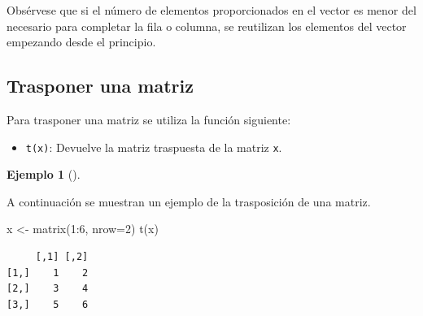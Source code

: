 \documentclass[
  a4paper,
]{scrreport}
\newenvironment{Shaded}{\begin{snugshade}}{\end{snugshade}}
\newcommand{\AttributeTok}[1]{\textcolor[rgb]{0.40,0.45,0.13}{#1}}
\newcommand{\DecValTok}[1]{\textcolor[rgb]{0.68,0.00,0.00}{#1}}
\newcommand{\FunctionTok}[1]{\textcolor[rgb]{0.28,0.35,0.67}{#1}}
\newcommand{\NormalTok}[1]{\textcolor[rgb]{0.00,0.23,0.31}{#1}}
\newcommand{\OtherTok}[1]{\textcolor[rgb]{0.00,0.23,0.31}{#1}}
\newcommand{\SpecialCharTok}[1]{\textcolor[rgb]{0.37,0.37,0.37}{#1}}
\providecommand{\tightlist}{%
  \setlength{\itemsep}{0pt}\setlength{\parskip}{0pt}}\usepackage{longtable,booktabs,array}
\theoremstyle{definition}
\theoremstyle{definition}
\newtheorem{example}{Ejemplo}[chapter]
\theoremstyle{remark}
\begin{document}
\begin{tcolorbox}[enhanced jigsaw, colbacktitle=quarto-callout-warning-color!10!white, breakable, opacitybacktitle=0.6, left=2mm, opacityback=0, leftrule=.75mm, colframe=quarto-callout-warning-color-frame, bottomrule=.15mm, toprule=.15mm, toptitle=1mm, colback=white, titlerule=0mm, title=\textcolor{quarto-callout-warning-color}{\faExclamationTriangle}\hspace{0.5em}{Advertencia}, rightrule=.15mm, arc=.35mm, bottomtitle=1mm, coltitle=black]

Obsérvese que si el número de elementos proporcionados en el vector es
menor del necesario para completar la fila o columna, se reutilizan los
elementos del vector empezando desde el principio.

\end{tcolorbox}

\hypertarget{trasponer-una-matriz}{%
\subsection{Trasponer una matriz}\label{trasponer-una-matriz}}

Para trasponer una matriz se utiliza la función siguiente:

\begin{itemize}
\tightlist
\item
  \texttt{t(x)}: Devuelve la matriz traspuesta de la matriz \texttt{x}.
\end{itemize}

\begin{example}[]\protect\hypertarget{exm-trasposicion-matriz}{}\label{exm-trasposicion-matriz}

A continuación se muestran un ejemplo de la trasposición de una matriz.

\begin{Shaded}
\begin{Highlighting}[]
\NormalTok{x }\OtherTok{\textless{}{-}} \FunctionTok{matrix}\NormalTok{(}\DecValTok{1}\SpecialCharTok{:}\DecValTok{6}\NormalTok{, }\AttributeTok{nrow=}\DecValTok{2}\NormalTok{)}
\FunctionTok{t}\NormalTok{(x)}
\end{Highlighting}
\end{Shaded}

\begin{verbatim}
     [,1] [,2]
[1,]    1    2
[2,]    3    4
[3,]    5    6
\end{verbatim}

\end{example}
\end{document}
